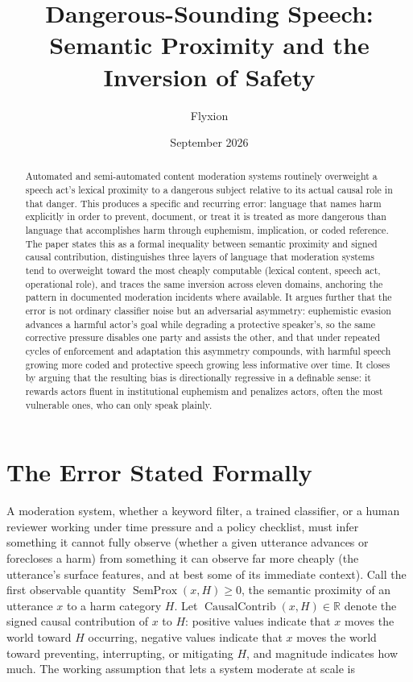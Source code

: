 \documentclass[11pt]{article}
\title{Dangerous-Sounding Speech:\\ Semantic Proximity and the Inversion of Safety}
\author{Flyxion}
\date{September 2026}
\begin{document}
\maketitle

\begin{abstract}
Automated and semi-automated content moderation systems routinely overweight a speech act's lexical proximity to a dangerous subject relative to its actual causal role in that danger. This produces a specific and recurring error: language that names harm explicitly in order to prevent, document, or treat it is treated as more dangerous than language that accomplishes harm through euphemism, implication, or coded reference. The paper states this as a formal inequality between semantic proximity and signed causal contribution, distinguishes three layers of language that moderation systems tend to overweight toward the most cheaply computable (lexical content, speech act, operational role), and traces the same inversion across eleven domains, anchoring the pattern in documented moderation incidents where available. It argues further that the error is not ordinary classifier noise but an adversarial asymmetry: euphemistic evasion advances a harmful actor's goal while degrading a protective speaker's, so the same corrective pressure disables one party and assists the other, and that under repeated cycles of enforcement and adaptation this asymmetry compounds, with harmful speech growing more coded and protective speech growing less informative over time. It closes by arguing that the resulting bias is directionally regressive in a definable sense: it rewards actors fluent in institutional euphemism and penalizes actors, often the most vulnerable ones, who can only speak plainly.
\end{abstract}

\section{The Error Stated Formally}

A moderation system, whether a keyword filter, a trained classifier, or a human reviewer working under time pressure and a policy checklist, must infer something it cannot fully observe (whether a given utterance advances or forecloses a harm) from something it can observe far more cheaply (the utterance's surface features, and at best some of its immediate context). Call the first observable quantity $\operatorname{SemProx}(x,H) \geq 0$, the semantic proximity of an utterance $x$ to a harm category $H$. Let $\operatorname{CausalContrib}(x,H) \in \mathbb{R}$ denote the signed causal contribution of $x$ to $H$: positive values indicate that $x$ moves the world toward $H$ occurring, negative values indicate that $x$ moves the world toward preventing, interrupting, or mitigating $H$, and magnitude indicates how much. The working assumption that lets a system moderate at scale is
\end{document}
